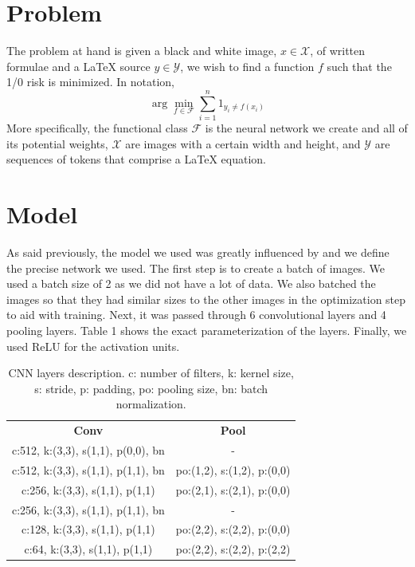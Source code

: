\documentclass{article}
\begin{document}
\section*{Problem}

The problem at hand is given a black and white image, $x \in \mathcal{X}$, of written formulae
and a \LaTeX{} source $y \in \mathcal{Y}$, we wish to find a function $f$ such that
the 1/0 risk is minimized. In notation,
$$
  \arg\min_{f \in \mathcal{F}} \sum_{i=1}^n 1_{y_i \neq f(x_i)}
$$
More specifically, the functional class $\mathcal{F}$ is the neural network we
create and all of its potential weights, $\mathcal{X}$ are images with a certain
width and height, and $\mathcal{Y}$ are sequences of tokens that comprise a \LaTeX{}
equation.

\section*{Model}

As said previously, the model we used was greatly influenced by \cite{1609.04938} and we define
the precise network we used. The first step is to create a batch of images. We used a batch size of
2 as we did not have a lot of data. We also batched the images so that they had similar
sizes to the other images in the optimization step to aid with training. Next, it was passed
through 6 convolutional layers and 4 pooling layers. Table 1 shows the exact parameterization
of the layers. Finally, we used ReLU for the activation units.

\begin{table}[t]
  \caption{CNN layers description. c: number of filters, k: kernel size, s: stride, p: padding, po: pooling size, bn: batch normalization.}
  \centering
  \begin{tabular}{c c}
    \toprule
    \textbf{Conv} & \textbf{Pool}               \\
    \cmidrule{1-2}
    c:512, k:(3,3), s(1,1), p(0,0), bn & - \\
    c:512, k:(3,3), s(1,1), p(1,1), bn & po:(1,2), s:(1,2), p:(0,0) \\
    c:256, k:(3,3), s(1,1), p(1,1) & po:(2,1), s:(2,1), p:(0,0) \\
    c:256, k:(3,3), s(1,1), p(1,1), bn & - \\
    c:128, k:(3,3), s(1,1), p(1,1) & po:(2,2), s:(2,2), p:(0,0) \\
    c:64, k:(3,3), s(1,1), p(1,1) & po:(2,2), s:(2,2), p:(2,2) \\
    \bottomrule
  \end{tabular}
\end{table}
\end{document}
